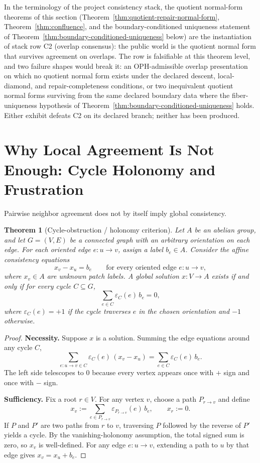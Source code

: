 \documentclass[11pt]{article}
\newtheorem{theorem}{Theorem}[section]
\theoremstyle{remark}
\theoremstyle{plain}
\begin{document}
In the terminology of the project consistency stack, the quotient
normal-form theorems of this section (Theorem~\ref{thm:quotient-repair-normal-form},
Theorem~\ref{thm:confluence}, and the boundary-conditioned uniqueness statement of
Theorem~\ref{thm:boundary-conditioned-uniqueness} below) are the instantiation of stack row C2
(overlap consensus): the public world is the quotient normal form that survives agreement on
overlaps. The row is falsifiable at this theorem level, and two failure shapes would break it: an
OPH-admissible overlap presentation on which no quotient normal form exists under the declared
descent, local-diamond, and repair-completeness conditions, or two inequivalent quotient normal
forms surviving from the same declared boundary data where the fiber-uniqueness hypothesis of
Theorem~\ref{thm:boundary-conditioned-uniqueness} holds. Either exhibit defeats C2 on its
declared branch; neither has been produced.

\section{Why Local Agreement Is Not Enough: Cycle Holonomy and Frustration}

Pairwise neighbor agreement does not by itself imply global consistency.

\begin{theorem}[Cycle-obstruction / holonomy criterion]\label{thm:holonomy}
Let $A$ be an abelian group, and let $G=(V,E)$ be a connected graph with an arbitrary orientation on each edge. For each oriented edge $e:u\to v$, assign a label $b_e\in A$. Consider the affine consistency equations
\[
x_v - x_u = b_e
\qquad
\text{for every oriented edge } e:u\to v,
\]
where $x_v\in A$ are unknown patch labels. A global solution $x:V\to A$ exists if and only if for every cycle $C\subseteq G$,
\[
\sum_{e\in C}\varepsilon_C(e)\, b_e = 0,
\]
where $\varepsilon_C(e)=+1$ if the cycle traverses $e$ in the chosen orientation and $-1$ otherwise.
\end{theorem}

\begin{proof}
\textbf{Necessity.} Suppose $x$ is a solution. Summing the edge equations around any cycle $C$,
\[
\sum_{e:u\to v\in C}\varepsilon_C(e)\,(x_v-x_u)
=
\sum_{e\in C}\varepsilon_C(e)\,b_e.
\]
The left side telescopes to $0$ because every vertex appears once with $+$ sign and once with $-$ sign.

\textbf{Sufficiency.} Fix a root $r\in V$. For any vertex $v$, choose a path $P_{r\to v}$ and define
\[
x_v := \sum_{e\in P_{r\to v}} \varepsilon_{P_{r\to v}}(e)\, b_e,
\qquad x_r:=0.
\]
If $P$ and $P'$ are two paths from $r$ to $v$, traversing $P$ followed by the reverse of $P'$ yields a cycle. By the vanishing-holonomy assumption, the total signed sum is zero, so $x_v$ is well-defined. For any edge $e:u\to v$, extending a path to $u$ by that edge gives $x_v = x_u + b_e$.
\end{proof}
\end{document}
